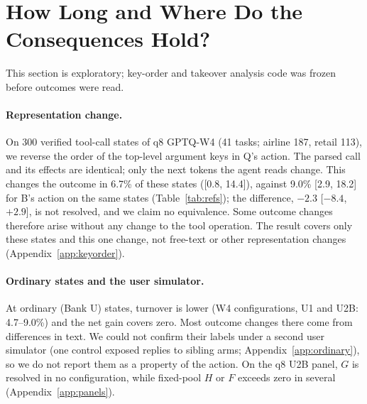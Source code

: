 \section{How Long and Where Do the Consequences Hold?}
\label{sec:scope}
\label{sec:duration}

This section is exploratory; key-order and takeover analysis code was frozen before outcomes were read.

\paragraph{Representation change.} On 300 verified tool-call states of q8 GPTQ-W4 (41 tasks; airline 187, retail 113), we reverse the order of the top-level argument keys in Q's action. The parsed call and its effects are identical; only the next tokens the agent reads change. This changes the outcome in 6.7\% of these states ([0.8, 14.4]), against 9.0\% [2.9, 18.2] for B's action on the same states (Table~\ref{tab:refs}); the difference, $-2.3$\pp{} [$-8.4$, $+2.9$], is not resolved, and we claim no equivalence. Some outcome changes therefore arise without any change to the tool operation. The result covers only these states and this one change, not free-text or other representation changes (Appendix~\ref{app:keyorder}). %

\paragraph{Ordinary states and the user simulator.} At ordinary (Bank U) states, turnover is lower (W4 configurations, U1 and U2B: 4.7--9.0\%) and the net gain covers zero. Most outcome changes there come from differences in text. We could not confirm their labels under a second user simulator (one control exposed replies to sibling arms; Appendix~\ref{app:ordinary}), so we do not report them as a property of the action. %
On the q8 U2B panel, $G$ is resolved in no configuration, while fixed-pool $H$ or $F$ exceeds zero in several (Appendix~\ref{app:panels}). %

